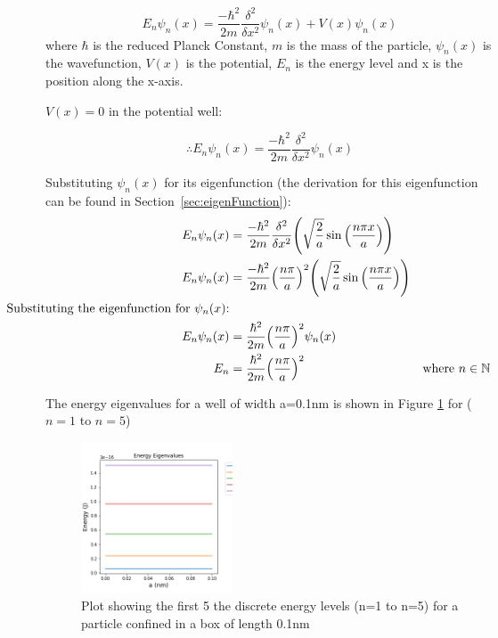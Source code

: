 $$E_n \psi_n (x) = \frac{-\hbar ^{2}}{2m}\frac{\delta^{2}}{\delta x^{2}}\psi_n (x) + V(x)\psi_n (x)$$
where $\hbar$ is the reduced Planck Constant, $m$ is the mass of the particle, $\psi_n (x)$ is the wavefunction, $V(x)$ is the potential, $E_n$ is the energy level and x is the position along the x-axis. 

$V(x)=0$ in the potential well: 

\begin{equation} \label{eq:shrod}
\therefore E_n \psi_n (x) = \frac{-\hbar ^{2}}{2m}\frac{\delta^{2}}{\delta x^{2}}\psi_n (x)
\end{equation}

Substituting $\psi_n (x)$ for its eigenfunction (the derivation for this eigenfunction can be found in Section~\ref{sec:eigenFunction}):
\begin{align*}
E_n \psi_n (x) &= \frac{-\hbar ^{2}}{2m}\frac{\delta^{2}}{\delta x^{2}}\Bigg(\sqrt{\frac{2}{a}}\sin\Big(\frac{n\pi x}{a}\Big)\Bigg)\\
E_n \psi_n (x) &= \frac{-\hbar ^{2}}{2m}\Big(\frac{n\pi}{a}\Big)^{2}\Bigg(\sqrt{\frac{2}{a}}\sin\Big(\frac{n\pi x}{a}\Big)\Bigg)\\
\hspace{-1.2cm}\text{Substituting the eigenfunction for }\psi_n (x)\text{:}\\
E_n \psi_n (x) &= \frac{\hbar ^{2}}{2m}\Big(\frac{n\pi}{a}\Big)^{2}\psi_n (x)\\
E_n &= \frac{\hbar ^{2}}{2m}\Big(\frac{n\pi}{a}\Big)^{2} & \text{where } n \in \mathbb{N}
\end{align*}

The energy eigenvalues for a well of width a=0.1nm is shown in Figure \ref{fig:eigenEnergy} for ($n=1$ to $n=5$)

\begin{figure}[h]
    \centering
    \includegraphics[width=0.4\textwidth]{lab1/images/eigenvaluesEnergy.png}
    \caption{Plot showing the first 5 the discrete energy levels (n=1 to n=5) for a particle confined in a box of length 0.1nm} 
    \label{fig:eigenEnergy}
\end{figure}

